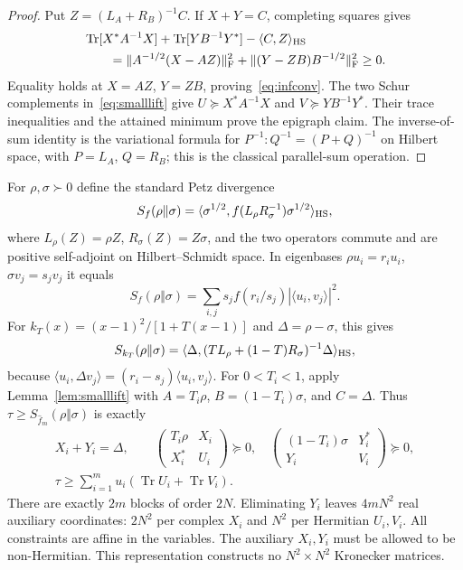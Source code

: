 \documentclass[11pt]{article}
\numberwithin{equation}{section}
\newcommand{\tr}{\operatorname{Tr}}
\begin{document}
\begin{proof}
Put $Z=(L_A+R_B)^{-1}C$. If $X+Y=C$, completing squares gives
\begin{align*}
 &\tr[X^*A^{-1}X]+\tr[YB^{-1}Y^*]
       -\langle C,Z\rangle_{\rm HS}\\
 &\qquad=\|A^{-1/2}(X-AZ)\|_{\rm F}^2
                +\|(Y-ZB)B^{-1/2}\|_{\rm F}^2\ge0.
\end{align*}
Equality holds at $X=AZ$, $Y=ZB$, proving~\eqref{eq:infconv}.
The two Schur complements in~\eqref{eq:smalllift} give
$U\succeq X^*A^{-1}X$ and $V\succeq YB^{-1}Y^*$.
Their trace inequalities and the attained minimum prove the epigraph
claim. The inverse-of-sum identity is the variational formula for
$P^{-1}:Q^{-1}=(P+Q)^{-1}$ on Hilbert space, with
$P=L_A$, $Q=R_B$; this is the classical parallel-sum operation.
\end{proof}

For $\rho,\sigma\succ0$ define the standard Petz divergence
\[
 S_f(\rho\Vert\sigma)=
  \langle\sigma^{1/2},f(L_\rho R_\sigma^{-1})\sigma^{1/2}\rangle_{\rm HS},
\]
where $L_\rho(Z)=\rho Z$, $R_\sigma(Z)=Z\sigma$, and
the two operators commute and are positive self-adjoint on
Hilbert--Schmidt space. In eigenbases $\rho u_i=r_i u_i$,
$\sigma v_j=s_j v_j$ it equals
\begin{equation}\label{eq:PetzSpectral}
 S_f(\rho\Vert\sigma)=\sum_{i,j}s_j f(r_i/s_j)
                                      |\langle u_i,v_j\rangle|^2.
\end{equation}
For $k_T(x)=(x-1)^2/[1+T(x-1)]$ and $\Delta=\rho-\sigma$, this gives
\begin{equation}\label{eq:PetzKernel}
 S_{k_T}(\rho\Vert\sigma)
   =\langle\Delta,(T L_\rho+(1-T)R_\sigma)^{-1}
                                                   \Delta\rangle_{\rm HS},
\end{equation}
because $\langle u_i,\Delta v_j\rangle
=(r_i-s_j)\langle u_i,v_j\rangle$.
For $0<T_i<1$, apply Lemma~\ref{lem:smalllift} with
$A=T_i\rho$, $B=(1-T_i)\sigma$, and $C=\Delta$. Thus
$\tau\ge S_{\widehat f_m}(\rho\Vert\sigma)$ is exactly
\begin{equation}\label{eq:PetzSDP}
 \begin{gathered}
 X_i+Y_i=\Delta,\qquad
 \begin{pmatrix}T_i\rho&X_i\\X_i^*&U_i\end{pmatrix}\succeq0,
 \quad
 \begin{pmatrix}(1-T_i)\sigma&Y_i^*\\Y_i&V_i\end{pmatrix}\succeq0,\\
 \tau\ge\sum_{i=1}^m u_i(\tr U_i+\tr V_i).
 \end{gathered}
\end{equation}
There are exactly $2m$ blocks of order $2N$. Eliminating $Y_i$ leaves
$4mN^2$ real auxiliary coordinates: $2N^2$ per complex $X_i$ and
$N^2$ per Hermitian $U_i,V_i$. All constraints are affine in the
variables. The auxiliary $X_i,Y_i$ must be allowed to be non-Hermitian.
This representation constructs no $N^2\times N^2$ Kronecker matrices.
\end{document}
